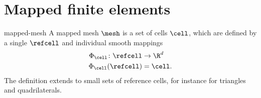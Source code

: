 

\section{Mapped finite elements}

\begin{Definition}{mapped-mesh}
  A mapped mesh $\mesh$ is a set of cells $\cell$, which are defined
  by a single  $\refcell$ and individual
  smooth mappings
  \begin{gather}
    \begin{split}
      \Phi_\cell \colon \refcell &\to \R^d\\
      \Phi_\cell(\refcell) &= \cell.
    \end{split}
  \end{gather}
  The definition extends to small sets of reference cells, for
  instance for triangles and quadrilaterals.
\end{Definition}

